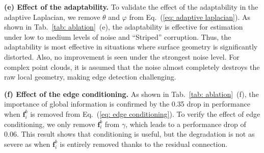 \documentclass[sigconf]{acmart}
\begin{document}
\textbf{(e) Effect of the adaptability.} 
To validate the effect of the adaptability in the adaptive Laplacian, we remove $\theta$ and $\varphi$ from Eq.~(\ref{eq: adaptive laplacian}). As shown in Tab.~\ref{tab: ablation}~(e), the adaptability is effective for estimation under low to medium levels of noise and ``Striped'' corruption. Thus, the adaptability is most effective in situations where surface geometry is significantly distorted. Also, no improvement is seen under the strongest noise level. For complex point clouds, it is assumed that the noise almost completely destroys the raw local geometry, making edge detection challenging. 


\textbf{(f) Effect of the edge conditioning.}
As shown in Tab.~\ref{tab: ablation}~(f), the importance of global information
is confirmed by the 0.35 drop in performance when $\textbf{f}_i^{b}$ is removed from Eq.~(\ref{eq: edge conditioning}). To verify the effect of edge conditioning, we only remove $\textbf{f}_i^{b}$ from $\gamma$, which leads to a performance drop of 0.06. This result shows that conditioning is useful, but the degradation is not as severe as when $\textbf{f}_i^{b}$ is entirely removed thanks to the residual connection.
\end{document}
